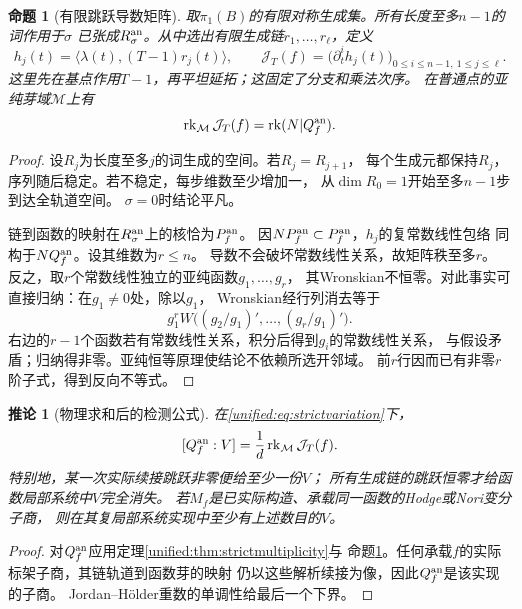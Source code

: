 \documentclass[11pt,a4paper,oneside]{ctexart}
\theoremstyle{cnplain}
\newtheorem{proposition}[theorem]{命题}
\newtheorem{corollary}[theorem]{推论}
\theoremstyle{definition}
\theoremstyle{remark}
\numberwithin{equation}{section}
\begin{document}
\begin{proposition}[有限跳跃导数矩阵]\label{unified:prop:jumpjet}
取$\pi_1(B)$的有限对称生成集。所有长度至多$n-1$的词作用于$\sigma$
已张成$R_\sigma^{\rm an}$。从中选出有限生成链$r_1,\ldots,r_\ell$，定义
\[
 h_j(t)=\langle\lambda(t),(T-1)r_j(t)\rangle,\qquad
 \mathcal J_T(f)=\bigl(\partial_t^i h_j(t)\bigr)_{
                              0\leq i\leq n-1,\ 1\leq j\leq\ell}.
\]
这里先在基点作用$T-1$，再平坦延拓；这固定了分支和乘法次序。
在普通点的亚纯芽域$\mathcal M$上有
\begin{equation}\label{unified:eq:jumpjetrank}
 \operatorname{rk}_{\mathcal M}\mathcal J_T(f)=\operatorname{rk}(N|Q_f^{\rm an}).
\end{equation}
\end{proposition}
\begin{proof}
设$R_j$为长度至多$j$的词生成的空间。若$R_j=R_{j+1}$，
每个生成元都保持$R_j$，序列随后稳定。若不稳定，每步维数至少增加一，
从$\dim R_0=1$开始至多$n-1$步到达全轨道空间。
$\sigma=0$时结论平凡。

链到函数的映射在$R_\sigma^{\rm an}$上的核恰为$P_f^{\rm an}$。
因$NP_f^{\rm an}\subset P_f^{\rm an}$，$h_j$的复常数线性包络
同构于$NQ_f^{\rm an}$。设其维数为$r\leq n$。
导数不会破坏常数线性关系，故矩阵秩至多$r$。
反之，取$r$个常数线性独立的亚纯函数$g_1,\ldots,g_r$，
其Wronskian不恒零。对此事实可直接归纳：在$g_1\ne0$处，除以$g_1$，
Wronskian经行列消去等于
\[
 g_1^r W\bigl((g_2/g_1)',\ldots,(g_r/g_1)'\bigr).
\]
右边的$r-1$个函数若有常数线性关系，积分后得到$g_i$的常数线性关系，
与假设矛盾；归纳得非零。亚纯恒等原理使结论不依赖所选开邻域。
前$r$行因而已有非零$r$阶子式，得到反向不等式。
\end{proof}

\begin{corollary}[物理求和后的检测公式]\label{unified:cor:physicalmultiplicity}
在\eqref{unified:eq:strictvariation}下，
\begin{equation}\label{unified:eq:functionmultiplicity}
 [Q_f^{\rm an}:V]=\frac{1}{d}\operatorname{rk}_{\mathcal M}\mathcal J_T(f).
\end{equation}
特别地，某一次实际续接跳跃非零便给至少一份$V$；
所有生成链的跳跃恒零才给函数局部系统中$V$完全消失。
若$M_f$是已实际构造、承载同一函数的Hodge或Nori变分子商，
则在其复局部系统实现中至少有上述数目的$V$。
\end{corollary}
\begin{proof}
对$Q_f^{\rm an}$应用定理\ref{unified:thm:strictmultiplicity}与
命题\ref{unified:prop:jumpjet}。任何承载$f$的实际标架子商，其链轨道到函数芽的映射
仍以这些解析续接为像，因此$Q_f^{\rm an}$是该实现的子商。
Jordan--Hölder重数的单调性给最后一个下界。
\end{proof}
\end{document}
